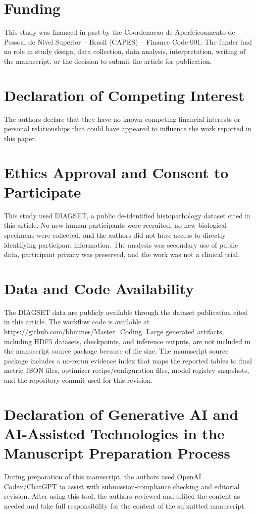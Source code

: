 \documentclass[a4paper,fleqn]{cas-dc}
\begin{document}
\printcredits

\section*{Funding}

This study was financed in part by the Coordenacao de Aperfeicoamento de Pessoal de Nivel Superior -- Brasil (CAPES) -- Finance Code 001. The funder had no role in study design, data collection, data analysis, interpretation, writing of the manuscript, or the decision to submit the article for publication.

\section*{Declaration of Competing Interest}

The authors declare that they have no known competing financial interests or personal relationships that could have appeared to influence the work reported in this paper.

\section*{Ethics Approval and Consent to Participate}

This study used DIAGSET, a public de-identified histopathology dataset cited in this article. No new human participants were recruited, no new biological specimens were collected, and the authors did not have access to directly identifying participant information. The analysis was secondary use of public data, participant privacy was preserved, and the work was not a clinical trial.

\section*{Data and Code Availability}

The DIAGSET data are publicly available through the dataset publication cited in this article. The workflow code is available at \url{https://github.com/bhnunes/Master_Coding}. Large generated artifacts, including HDF5 datasets, checkpoints, and inference outputs, are not included in the manuscript source package because of file size. The manuscript source package includes a no-rerun evidence index that maps the reported tables to final metric JSON files, optimizer recipe/configuration files, model registry snapshots, and the repository commit used for this revision.

\section*{Declaration of Generative AI and AI-Assisted Technologies in the Manuscript Preparation Process}

During preparation of this manuscript, the authors used OpenAI Codex/ChatGPT to assist with submission-compliance checking and editorial revision. After using this tool, the authors reviewed and edited the content as needed and take full responsibility for the content of the submitted manuscript.



\end{document}
